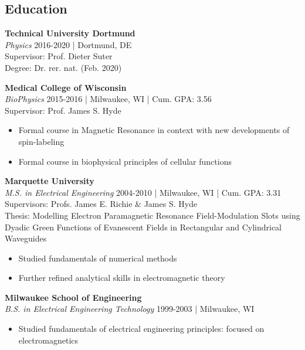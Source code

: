 \subsection*{Education} 
\vspace{-0.5em}
\noindent\textbf{Technical University Dortmund} \\
\textit{Physics} 2016-2020 | Dortmund, DE \\
Supervisor: Prof. Dieter Suter  \\
Degree: Dr. rer. nat. (Feb. 2020)
\newline

\noindent\textbf{Medical College of Wisconsin} \\
\textit{BioPhysics} 2015-2016 | Milwaukee, WI | Cum. GPA: 3.56 \\
Supervisor: Prof. James S. Hyde
\vspace{-0.5em}
\begin{itemize}
\setlength\itemsep{-0.5em}
    \item Formal course in Magnetic Resonance in context with new developments of spin-labeling
    \item Formal course in biophysical principles of cellular functions 
\end{itemize}

\noindent\textbf{Marquette University} \\
\textit{M.S. in Electrical Engineering} 2004-2010 | Milwaukee, WI | Cum. GPA: 3.31 \\
Supervisors: Profs. James E. Richie \& James S. Hyde \\
Thesis: Modelling Electron Paramagnetic Resonance Field-Modulation Slots using Dyadic Green Functions of Evanescent Fields in Rectangular and Cylindrical Waveguides
\vspace{-0.5em}
\begin{itemize}
\setlength\itemsep{-0.5em}
    \item Studied fundamentals of numerical methods
    \item Further refined analytical skills in electromagnetic theory 
\end{itemize}

\noindent\textbf{Milwaukee School of Engineering}\\
\textit{B.S. in Electrical Engineering Technology}
1999-2003 | Milwaukee, WI
\vspace{-0.5em}
\begin{itemize}
\setlength\itemsep{-0.5em}
    \item Studied fundamentals of electrical engineering principles: focused on electromagnetics
\end{itemize}

